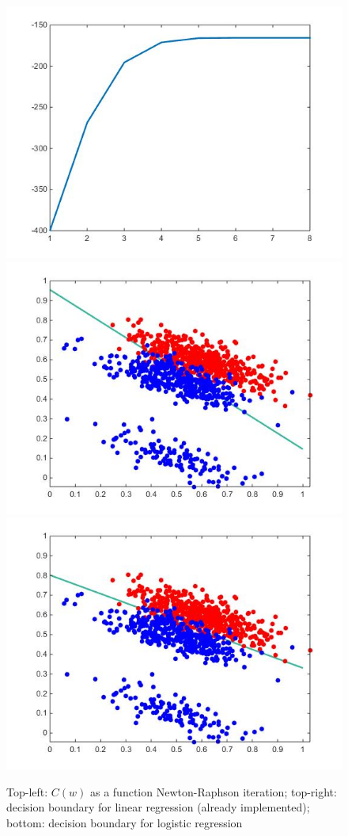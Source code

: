 \documentclass[a4paper, 12pt]{article}
\begin{document}
\begin{figure}[!htbp]
\centering
\noindent\includegraphics[scale=0.4]{images/ass1-img1.jpg}
\noindent\includegraphics[scale=0.4]{images/ass1-img2.jpg}
\noindent\includegraphics[scale=0.4]{images/ass1-img3.jpg}
\caption{Top-left: $C(w)$ as a function Newton-Raphson iteration; top-right: decision boundary for linear regression (already implemented); bottom: decision boundary for logistic regression}
\end{figure}
\end{document}
